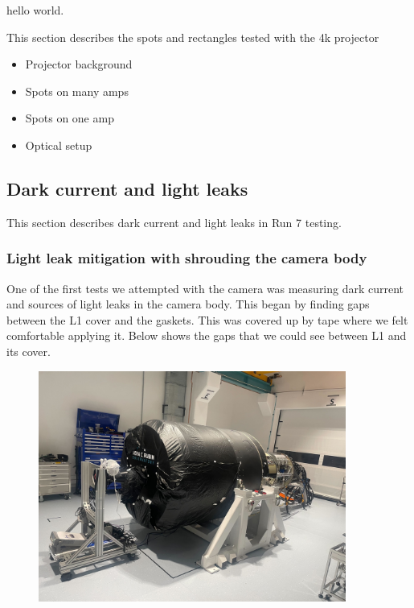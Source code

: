 hello world.

This section describes the spots and rectangles tested with the 4k
projector

\begin{itemize}
\tightlist
\item
  Projector background
\item
  Spots on many amps
\item
  Spots on one amp
\item
  Optical setup
\end{itemize}

\subsection{Dark current and light
leaks}\label{dark-current-and-light-leaks}

This section describes dark current and light leaks in Run 7 testing.

\subsubsection{Light leak mitigation with shrouding the camera
body}\label{light-leak-mitigation-with-shrouding-the-camera-body}

One of the first tests we attempted with the camera was measuring dark
current and sources of light leaks in the camera body. This began by
finding gaps between the L1 cover and the gaskets. This was covered up
by tape where we felt comfortable applying it. Below shows the gaps that
we could see between L1 and its cover.

\begin{figure}
\centering
\includegraphics[width=0.9\textwidth]{sections/figures/Camera_Shroud.jpg}
\caption{}
\end{figure}

